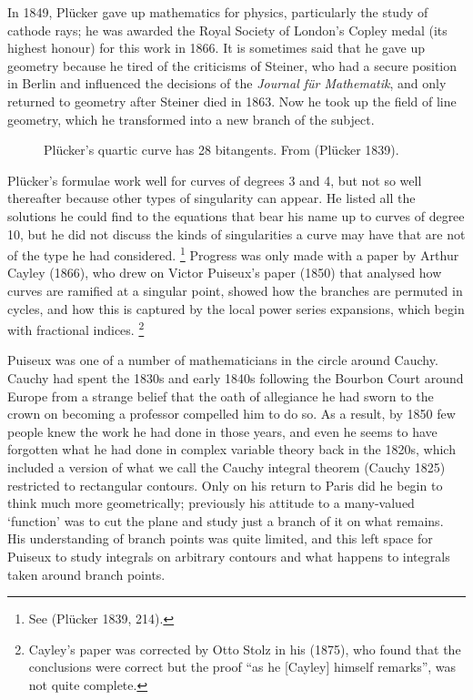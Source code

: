 In 1849, Pl\"ucker gave up mathematics for physics, particularly the study
of cathode rays; he was awarded the Royal Society of London's Copley
medal (its highest honour) for this work in 1866. It is sometimes said
that he gave up geometry because he tired of the criticisms of Steiner,
who had a secure position in Berlin and influenced the decisions of the
\emph{Journal f\"ur Mathematik}, and only returned to geometry after
Steiner died in 1863. Now he took up  the field of line geometry, which
he transformed into a new branch of the subject.

\begin{figure}
\caption{Pl\"ucker's quartic curve has 28 bitangents. From (Pl\"ucker
1839).}
      \label{fig28bitangents}
\end{figure}

Pl\"ucker's formulae work well for curves of degrees 3 and 4,  but not so
well thereafter because other types of singularity can appear.   He listed
all the solutions he could find to the equations that bear his name up to
curves of degree 10, but he did not discuss the kinds of singularities a
curve may have that are not of the type he had considered.%
%
\footnote{See (Pl\"ucker 1839, 214).}  
%
Progress was only made with a paper by Arthur
Cayley (1866), who drew on Victor Puiseux's paper (1850) that analysed
how curves are ramified at a singular point,  showed how the branches are
permuted in cycles, and how this is captured by the local power series
expansions, which begin with fractional indices.%
\footnote{Cayley's paper
was corrected by Otto Stolz in his (1875), who found that the conclusions
were correct but the proof ``as he [Cayley] himself remarks'', was not
quite complete.}

Puiseux was one of a number of mathematicians in the circle around
Cau\-chy. Cauchy had spent the 1830s and early 1840s following the
Bourbon Court around Europe from a strange belief that the oath of
allegiance he had sworn to the crown on becoming a professor compelled
him to do so. As a result, by 1850 few people knew the work he had done
in those years, and even he seems to have forgotten what he had done
in complex variable theory back in the 1820s, which included a version
of what we call the Cauchy integral theorem (Cauchy 1825) restricted
to rectangular contours. Only on his return to Paris did he begin to
think much more geometrically; previously his attitude to a many-valued
`function' was to cut the plane and study just a branch of it on what
remains. His understanding of branch points was quite limited, and this
left space for Puiseux to study integrals on arbitrary contours   and
what happens to integrals taken around branch points.

